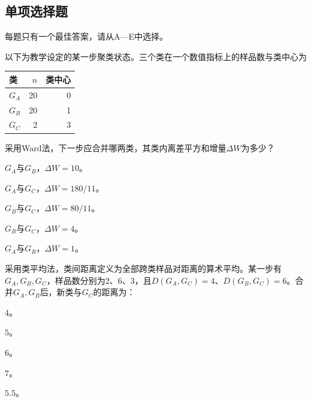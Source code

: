 \subsection{单项选择题}
每题只有一个最佳答案，请从A—E中选择。

\par\noindent\begin{minipage}{\linewidth}
以下为教学设定的某一步聚类状态。三个类在一个数值指标上的样品数与类中心为\begin{center}\small\setlength{\tabcolsep}{5pt}
\begin{tabular}{@{}lrr@{}}
\toprule
类 & $n$ & 类中心 \\
\midrule
$G_A$ & 20 & 0 \\
$G_B$ & 20 & 1 \\
$G_C$ & 2 & 3 \\
\bottomrule
\end{tabular}
\end{center}采用Ward法，下一步应合并哪两类，其类内离差平方和增量$\Delta W$为多少？
\begin{choices}
\item $G_A$与$G_B$，$\Delta W=10$。
\item $G_A$与$G_C$，$\Delta W=180/11$。
\item $G_B$与$G_C$，$\Delta W=80/11$。
\item $G_B$与$G_C$，$\Delta W=4$。
\item $G_A$与$G_B$，$\Delta W=1$。
\end{choices}
\end{minipage}\par\medskip

\par\noindent\begin{minipage}{\linewidth}
采用类平均法，类间距离定义为全部跨类样品对距离的算术平均。某一步有$G_A,G_B,G_C$，样品数分别为2、6、3，且$D(G_A,G_C)=4$、$D(G_B,G_C)=6$。合并$G_A,G_B$后，新类与$G_C$的距离为：
\begin{choices}
\item $4$。
\item $5$。
\item $6$。
\item $7$。
\item $5.5$。
\end{choices}
\end{minipage}\par\medskip

